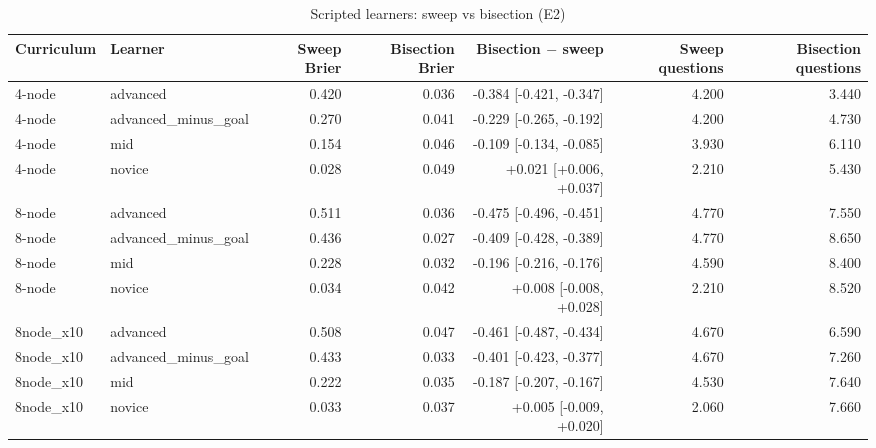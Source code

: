 \begin{table}[htbp]
\centering\small
\caption{Scripted learners: sweep vs bisection (E2)}
\label{tab:t4}
\begin{tabular}{llrrrrr}
\toprule
Curriculum & Learner & Sweep Brier & Bisection Brier & Bisection $-$ sweep & Sweep questions & Bisection questions \\
\midrule
4-node & advanced & 0.420 & 0.036 & -0.384 [-0.421, -0.347] & 4.200 & 3.440 \\
4-node & advanced\_minus\_goal & 0.270 & 0.041 & -0.229 [-0.265, -0.192] & 4.200 & 4.730 \\
4-node & mid & 0.154 & 0.046 & -0.109 [-0.134, -0.085] & 3.930 & 6.110 \\
4-node & novice & 0.028 & 0.049 & +0.021 [+0.006, +0.037] & 2.210 & 5.430 \\
8-node & advanced & 0.511 & 0.036 & -0.475 [-0.496, -0.451] & 4.770 & 7.550 \\
8-node & advanced\_minus\_goal & 0.436 & 0.027 & -0.409 [-0.428, -0.389] & 4.770 & 8.650 \\
8-node & mid & 0.228 & 0.032 & -0.196 [-0.216, -0.176] & 4.590 & 8.400 \\
8-node & novice & 0.034 & 0.042 & +0.008 [-0.008, +0.028] & 2.210 & 8.520 \\
8node\_x10 & advanced & 0.508 & 0.047 & -0.461 [-0.487, -0.434] & 4.670 & 6.590 \\
8node\_x10 & advanced\_minus\_goal & 0.433 & 0.033 & -0.401 [-0.423, -0.377] & 4.670 & 7.260 \\
8node\_x10 & mid & 0.222 & 0.035 & -0.187 [-0.207, -0.167] & 4.530 & 7.640 \\
8node\_x10 & novice & 0.033 & 0.037 & +0.005 [-0.009, +0.020] & 2.060 & 7.660 \\
\bottomrule
\end{tabular}
\end{table}
